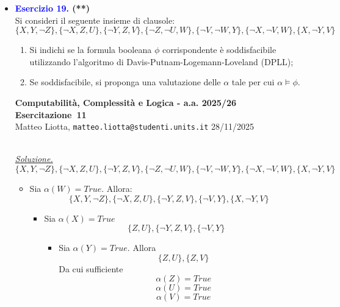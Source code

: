 \documentclass[a4paper,10pt]{article}
\makeatletter
\newcommand{\EsercitazioneNum}{11}
\newcommand{\Data}{28/11/2025}
\newcommand{\DocType}{Esercitazione} %
\newcommand{\FullTitle}{\DocType\ \EsercitazioneNum}
\newcommand{\Header}{
\noindent
  \small \textbf{Computabilità, Complessità e Logica - a.a. 2025/26} \hfill \textbf{\FullTitle} \\[0.2cm]
  \scriptsize Matteo Liotta, \texttt{matteo.liotta@studenti.units.it} \hfill \Data \\[0.2cm]
  \noindent\makebox[\linewidth]{\rule{\linewidth}{0.4pt}} \\[0.3cm]}
\newcommand{\NewPageHeader}{
  \vfill
  \noindent\makebox[\linewidth]{\rule{\linewidth}{0.4pt}}
  \newpage
  {\Header}
}
\makeatother
\begin{document}
{\begin{itemize}[label=, leftmargin=0pt]
\begin{osservazioni}
    Abbiamo trovato un modello che soffisfa $\phi$:

       $$\alpha := \{P\rightarrow True,\ Q\rightarrow True,\ R\rightarrow False,\ S\rightarrow True\} $$

    Ne segue dunque la soddisfacibilità della formula.
    
    
    \end{osservazioni}

    \item \textbf{\textcolor{blue}{Esercizio 19.} (**)}\\ 	
    Si consideri il seguente insieme di clausole:
    $$\{X, Y, \lnot Z\}, \{\lnot X, Z, U\}, \{\lnot Y, Z, V\}, \{\lnot Z, \lnot U, W\}, \{\lnot V, \lnot W, Y\}, \{\lnot X, \lnot V, W\}, \{X, \lnot Y, V\}$$
    \begin{enumerate}
        \item Si indichi se la formula booleana $\phi$ corrispondente è soddisfacibile utilizzando l'algoritmo di Davis-Putnam-Logemann-Loveland (DPLL);
        \item Se soddisfacibile, si proponga una valutazione delle  $\alpha$ tale per cui $\alpha\models\phi$.
    \end{enumerate}

    \NewPageHeader

    \begin{osservazioni}
    \underline{\textit{Soluzione.}}\\
    
    $$\{X, Y, \lnot Z\}, \{\lnot X, Z, U\}, \{\lnot Y, Z, V\}, \{\lnot Z, \lnot U, W\}, \{\lnot V, \lnot W, Y\}, \{\lnot X, \lnot V, W\}, \{X, \lnot Y, V\}$$

    \begin{itemize}[label=*]
        \item Sia $\alpha(W)=True$. Allora:
        $$\{X, Y, \lnot Z\}, \{\lnot X, Z, U\}, \{\lnot Y, Z, V\}, \{\lnot V, Y\}, \{X, \lnot Y, V\}$$
        \begin{itemize}[label=*]
            \item Sia $\alpha(X)=True$
            $$\{Z, U\}, \{\lnot Y, Z, V\}, \{\lnot V, Y\}$$
            \begin{itemize}[label=*]
                \item Sia $\alpha(Y)=True$. Allora
                $$\{Z, U\}, \{Z, V\}$$
                Da cui sufficiente 
                $$\alpha(Z)=True$$
                $$\alpha(U)=True$$
                $$\alpha(V)=True$$
            \end{itemize}
        \end{itemize}
    \end{itemize}


\end{osservazioni}
\end{itemize}}
\end{document}
